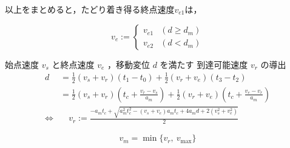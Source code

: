 \documentclass[a5paper]{ltjsarticle}
\begin{document}
以上をまとめると，たどり着き得る終点速度$v_{e1}$は，

$$
    v_{e} :=
    \left\{\begin{array}{ll}
        v_{e1} & (d        \ge d_m) \\
        v_{e2} & (d < d_m)
    \end{array}\right.
$$

始点速度 $v_s$ と終点速度 $v_e$ ，移動変位 $d$ を満たす
到達可能速度 $v_r$ の導出
\begin{align}
    d               & =
    \frac{1}{2}(v_s+v_r)(t_1-t_0)+
    \frac{1}{2}(v_r+v_e)(t_3-t_2)
    \\
                    & =
    \frac{1}{2}(v_s+v_r)\left(t_c+\frac{v_r-v_s}{a_m}\right)+
    \frac{1}{2}(v_r+v_e)\left(t_c+\frac{v_e-v_r}{a_m}\right)
    \\
    \Leftrightarrow & \quad
    v_r := \frac{-a_mt_c + \sqrt{a_m^2t_c^2-(v_s+v_e)a_mt_c+4a_md+2(v_s^2+v_e^2)}}{2}
\end{align}

$$
    v_m = \min\{v_r,~v_{\max} \}
$$
\end{document}
